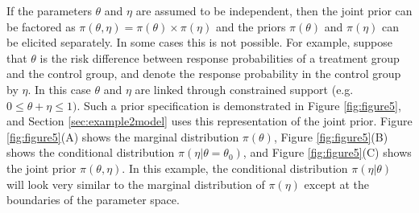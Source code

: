 \documentclass[12pt]{article}
\begin{document}
If the parameters $\theta$ and $\eta$ are assumed to be independent, then the joint prior can be factored as $\pi(\theta,\eta)=\pi(\theta)\times\pi(\eta)$ and the priors $\pi(\theta)$ and $\pi(\eta)$ can be elicited separately.
%
In some cases this is not possible. For example, suppose that $\theta$ is the risk difference between response probabilities of a treatment group and the control group, and denote the response probability in the control group by $\eta$.
%
In this case $\theta$ and $\eta$  are linked through constrained support (e.g. $0\leq \theta+\eta\leq 1)$. Such a prior specification is demonstrated in Figure \ref{fig:figure5}, and Section \ref{sec:example2model} uses this representation of the joint prior. Figure \ref{fig:figure5}(A) shows the marginal distribution $\pi(\theta)$, Figure \ref{fig:figure5}(B) shows the conditional distribution $\pi(\eta|\theta=\theta_0)$, and Figure \ref{fig:figure5}(C) shows the joint prior $\pi(\theta,\eta)$. In this example, the conditional distribution $\pi(\eta|\theta)$ will look very similar to the marginal distribution of $\pi(\eta)$ except at the boundaries of the parameter space.




\end{document}
